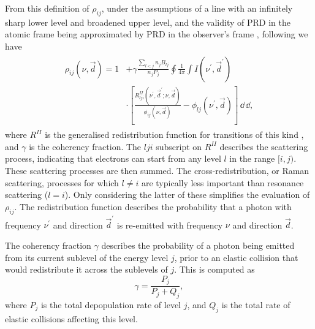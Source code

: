 From this definition of $\rho_{ij}$, under the assumptions of a line with an infinitely sharp lower level and broadened upper level, and the validity of PRD in the atomic frame being approximated by PRD in the observer's frame \citep{Uitenbroek2001}, following \citet{Hubeny2014} we have
\begin{align}
\begin{split}
    \rho_{ij}(\nu, \vec{d}) = 1 &+ \gamma\frac{\sum_{l < j}n_j B_{lj}}{n_j P_j} \oint\frac{1}{4\pi}\int I(\nu^\prime, \vec{d}^\prime) \\ &\cdot \left[ \frac{R^{II}_{lji}(\nu^\prime, \vec{d}^\prime; \nu, \vec{d})}{\phi_{ij}(\nu, \vec{d})} - \phi_{lj}(\nu^\prime, \vec{d}) \right] \mathop{\dd{}\nu^\prime}\mathop{\dd{}\Omega^\prime},
\end{split}
\end{align}
where $R^{II}$ is the generalised redistribution function for transitions of this kind \citep{Hubeny1982}, and $\gamma$ is the coherency fraction.
The $lji$ subscript on $R^{II}$ describes the scattering process, indicating that electrons can start from any level $l$ in the range $[i, j)$.
These scattering processes are then summed.
The cross-redistribution, or Raman scattering, processes for which $l\neq i$ are typically less important than resonance scattering ($l = i$).
Only considering the latter of these simplifies the evaluation of $\rho_{ij}$.
The redistribution function describes the probability that a photon with frequency $\nu^\prime$ and direction $\vec{d}^\prime$ is re-emitted with frequency $\nu$ and direction $\vec{d}$.

The coherency fraction $\gamma$ describes the probability of a photon being emitted from its current sublevel of the energy level $j$, prior to an elastic collision that would redistribute it across the sublevels of $j$.
This is computed as
\begin{equation}
    \gamma = \frac{P_j}{P_j + Q_j},
\end{equation}
where $P_j$ is the total depopulation rate of level $j$, and $Q_j$ is the total rate of elastic collisions affecting this level.


